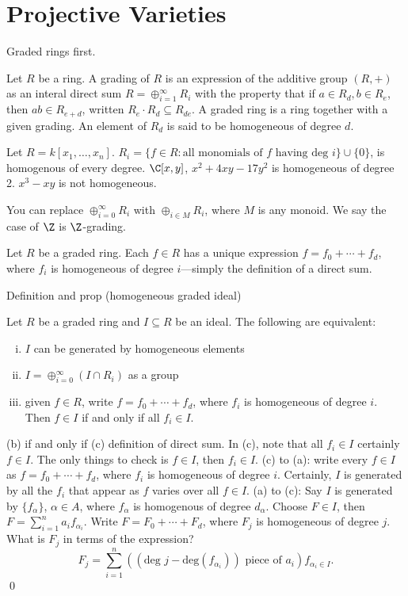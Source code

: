 \section{Projective Varieties}

Graded rings first.

\begin{dfn}[Grading]
Let $R$ be a ring. A grading of $R$ is an expression of the additive group $(R,+)$ as an interal direct sum $R= \oplus_{i=1}^\infty R_i$ with the property that if $a \in R_d, b \in R_e$, then $ab \in R_{e+d}$, written $R_e \cdot R_d \subseteq R_{de}$. A graded ring is a ring together with a given grading. An element of $R_d$ is said to be homogeneous of degree $d$. 
\end{dfn}


\begin{ex}
Let $R= k[x_1,\ldots,x_n]$. $R_i= \{ f \in R \colon \text{all monomials of }f\text{ having deg }i\} \cup \{0\}$, is homogenous of every degree. $\C[x,y]$, $x^2+4xy-17y^2$ is homogeneous of degree 2. $x^3-xy$ is not homogeneous. 
\end{ex}


\begin{rem}
You can replace $\oplus_{i=0}^\infty R_i$ with $\oplus_{i \in M} R_i$, where $M$ is any monoid. We say the case of $\Z$ is $\Z$-grading. 
\end{rem}


Let $R$ be a graded ring. Each $f \in R$ has a unique expression $f= f_0 + \cdots + f_d$, where $f_i$ is homogeneous of degree $i$---simply the definition of a direct sum. 


Definition and prop (homogeneous graded ideal)


\begin{prop}
Let $R$ be a graded ring and $I \subseteq R$ be an ideal. The following are equivalent:
\begin{enumerate}[(i)]
\item $I$ can be generated by homogeneous elements
\item $I= \oplus_{i=0}^\infty (I \cap R_i)$ as a group
\item given $f \in R$, write $f= f_0 + \cdots + f_d$, where $f_i$ is homogeneous of degree $i$. Then $f \in I$ if and only if all $f_i \in I$. 
\end{enumerate}
\end{prop}

\pf (b) if and only if (c) definition of direct sum. In (c), note that all $f_i \in I$ certainly $f \in I$. The only things to check is $f \in I$, then $f_i \in I$. (c) to (a): write every $f \in I$ as $f= f_0 + \cdots + f_d$, where $f_i$ is homogeneous of degree $i$. Certainly, $I$ is generated by all the $f_i$ that appear as $f$ varies over all $f \in I$. (a) to (c): Say $I$ is generated by $\{f_\alpha\}$, $\alpha \in A$, where $f_\alpha$ is homogenous of degree $d_\alpha$. Choose $F \in I$, then $F= \sum_{i=1}^n a_i f_{\alpha_i}$. Write $F= F_0 + \cdots + F_d$, where $F_j$ is homogeneous of degree $j$. What is $F_j$ in terms of the expression?
	\[
	F_j= \sum_{i=1}^n ((\text{deg }j - \text{deg}(f_{\alpha_i})) \text{ piece of }a_i) f_{\alpha_i \in I}. 
	\] \qed \\


